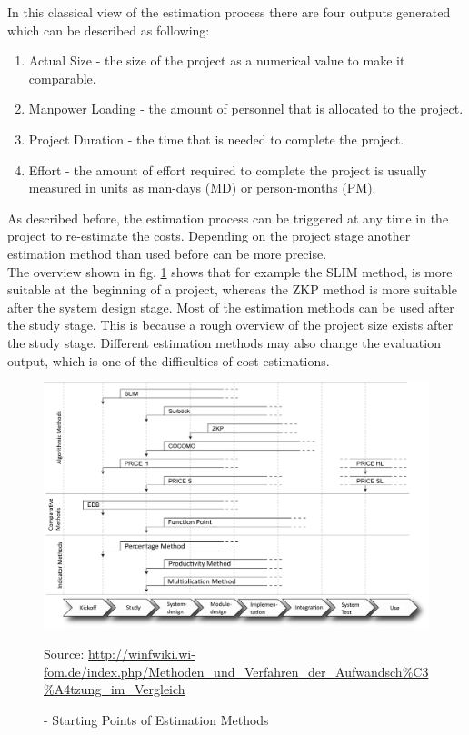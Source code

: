 In this classical view of the estimation process there are four outputs generated which can be described as following:
\begin{enumerate}
	\item Actual Size - the size of the project as a numerical value to make it comparable.
	\item Manpower Loading - the amount of personnel that is allocated to the project.
	\item Project Duration - the time that is needed to complete the project.
	\item Effort - the amount of effort required to complete the project is usually measured in units as man-days (MD) or person-months (PM).
\end{enumerate}
As described before, the estimation process can be triggered at any time in the project to re-estimate the costs. Depending on the project stage another estimation method than used before can be more precise.\\
The overview shown in fig. \ref{fig:estimationMethodInStage} shows that for example the SLIM method, is more suitable at the beginning of a project, whereas the ZKP method is more suitable after the system design stage. Most of the estimation methods can be used after the study stage. This is because a rough overview of the project size exists after the study stage. Different estimation methods may also change the evaluation output, which is one of the difficulties of cost estimations.\\
\begin{figure}[h] 
	\centering 
	\includegraphics[width=13cm]{images/Einsatzzeitpunkte2.PNG} 
	\caption{- Starting Points of Estimation Methods} 
	Source: \url{http://winfwiki.wi-fom.de/index.php/Methoden_und_Verfahren_der_Aufwandsch\%C3\%A4tzung_im_Vergleich}
	\label{fig:estimationMethodInStage}
\end{figure}

